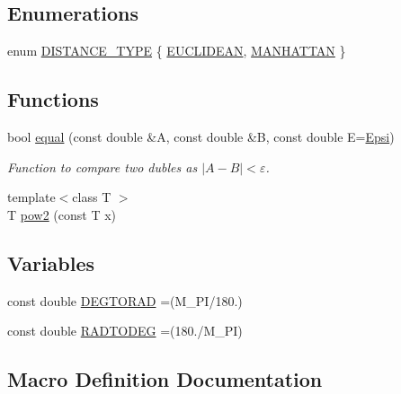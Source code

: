 \subsection*{Enumerations}
\begin{DoxyCompactItemize}
\item 
enum \mbox{\hyperlink{maths_8hh_ac50d7263b1cae8691420b86282b27f90}{D\+I\+S\+T\+A\+N\+C\+E\+\_\+\+T\+Y\+PE}} \{ \mbox{\hyperlink{maths_8hh_ac50d7263b1cae8691420b86282b27f90a81bbbc4428c3ff3f1327e94957e2b5f1}{E\+U\+C\+L\+I\+D\+E\+AN}}, 
\mbox{\hyperlink{maths_8hh_ac50d7263b1cae8691420b86282b27f90a9ae95b5995796e7e5f32fa482a5bff98}{M\+A\+N\+H\+A\+T\+T\+AN}}
 \}
\end{DoxyCompactItemize}
\subsection*{Functions}
\begin{DoxyCompactItemize}
\item 
bool \mbox{\hyperlink{maths_8hh_a24e66125d5c9aea6608f537bdf77841e}{equal}} (const double \&A, const double \&B, const double E=\mbox{\hyperlink{maths_8hh_a78802b279ab85021d7f6bffe51621703}{Epsi}})
\begin{DoxyCompactList}\small\item\em Function to compare two dubles as $\vert A-B\vert < \varepsilon$. \end{DoxyCompactList}\item 
{\footnotesize template$<$class T $>$ }\\T \mbox{\hyperlink{maths_8hh_a054f7427a96b10baa550060a0376584c}{pow2}} (const T x)
\end{DoxyCompactItemize}
\subsection*{Variables}
\begin{DoxyCompactItemize}
\item 
const double \mbox{\hyperlink{maths_8hh_abe8c019db43eb490b67df53e48a69d28}{D\+E\+G\+T\+O\+R\+AD}} =(M\+\_\+\+PI/180.)
\item 
const double \mbox{\hyperlink{maths_8hh_abbe9061bc2ecde6e056b25705a50a829}{R\+A\+D\+T\+O\+D\+EG}} =(180./M\+\_\+\+PI)
\end{DoxyCompactItemize}


\subsection{Macro Definition Documentation}
\mbox{\label{maths_8hh_ac37f3aecadc99641dd1c8b4c81d96f7e}} 
